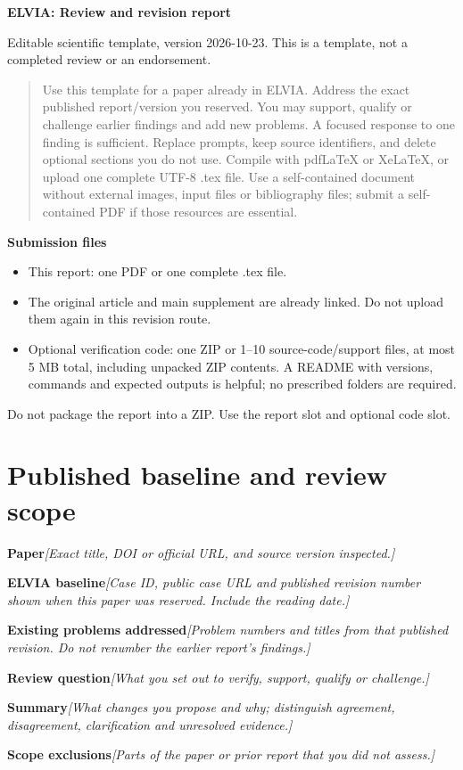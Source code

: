\documentclass[11pt]{article}
\newcommand{\prompt}[1]{\textit{\textcolor{promptink}{[#1]}}}
\newcommand{\entry}[2]{\textbf{#1}\quad\prompt{#2}\par}
\newcommand{\guidance}[1]{\begin{quote}\small #1\end{quote}}
\begin{document}
{\Large\bfseries\color{elvia} ELVIA: Review and revision report}\par
{\small Editable scientific template, version 2026-10-23. This is a template,
not a completed review or an endorsement.}
\guidance{Use this template for a paper already in ELVIA. Address the exact published
report/version you reserved. You may support, qualify or challenge earlier findings
and add new problems. A focused response to one finding is sufficient. Replace
prompts, keep source identifiers, and delete optional sections you do not use.
Compile with pdfLaTeX or XeLaTeX, or upload one complete UTF-8 .tex file.
Use a self-contained document without external images, input files or bibliography
files; submit a self-contained PDF if those resources are essential.}

\textbf{Submission files}
\begin{itemize}
\item This report: one PDF or one complete .tex file.
\item The original article and main supplement are already linked. Do not upload
them again in this revision route.
\item Optional verification code: one ZIP or 1--10 source-code/support files,
at most 5 MB total, including unpacked ZIP contents. A README with versions,
commands and expected outputs is helpful; no prescribed folders are required.
\end{itemize}
Do not package the report into a ZIP. Use the report slot and optional code slot.

\section{Published baseline and review scope}
\entry{Paper}{Exact title, DOI or official URL, and source version inspected.}
\entry{ELVIA baseline}{Case ID, public case URL and published revision number
shown when this paper was reserved. Include the reading date.}
\entry{Existing problems addressed}{Problem numbers and titles from that published
revision. Do not renumber the earlier report's findings.}
\entry{Review question}{What you set out to verify, support, qualify or challenge.}
\entry{Summary}{What changes you propose and why; distinguish agreement,
disagreement, clarification and unresolved evidence.}
\entry{Scope exclusions}{Parts of the paper or prior report that you did not assess.}
\end{document}
